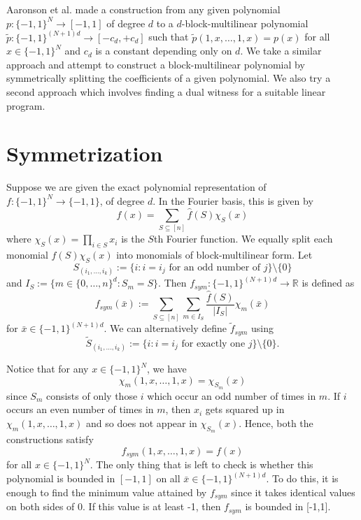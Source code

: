 \documentclass[12pt]{report}
\begin{document}
Aaronson et al. \cite{paper2} made a construction from any given polynomial $p\colon \{-1,1\}^{N} \rightarrow [-1,1]$ of degree $d$ to a $d$-block-multilinear polynomial $\tilde{p}\colon \{-1,1\}^{(N+1) d} \rightarrow [-c_d, +c_d]$ such that $\tilde{p}(1,x, \ldots, 1,x) = p(x)$ for all $x \in\{-1,1\}^{N}$ and $c_d$ is a constant depending only on $d$. We take a similar approach and attempt to construct a block-multilinear polynomial by symmetrically splitting the coefficients of a given polynomial. We also try a second approach which involves finding a dual witness for a suitable linear program.

\section{Symmetrization}
Suppose we are given the exact polynomial representation of $f\colon \{-1,1\}^N\rightarrow \{-1,1\}$, of degree $d$. In the Fourier basis, this is given by
\begin{equation}
    f(x) = \sum_{S\subseteq [n]} \hat{f}(S) \chi_S(x)
\end{equation}
where $\chi_S(x) = \prod_{i\in S}x_i$ is the $S$th Fourier function. We equally split each monomial $\hat{f}(S) \chi_S(x)$ into monomials of block-multilinear form. Let
\begin{equation}
S_{(i_1, \dots, i_k)} := \{i\colon i = i_j\text{ for an odd number of }j\} \setminus \{0\}
\end{equation} and $I_S := \{m\in \{0, \ldots, n\}^d\colon S_m = S\}$. Then $f_{sym}\colon \{-1,1\}^{(N+1)d} \rightarrow \mathbb{R}$ is defined as
\begin{equation}
    f_{sym}(\bar{x}) := \sum_{S\subseteq [n]} \sum_{m\in I_S} \frac{\hat{f}(S)}{|I_S|} \chi_m(\bar{x})
\end{equation}
for $\bar{x}\in \{-1,1\}^{(N+1)d}$. We can alternatively define $\tilde{f}_{sym}$ using
\begin{equation}
    \tilde{S}_{(i_1, \dots, i_k)} := \{i\colon i = i_j\text{ for exactly one }j\} \setminus \{0\}.
\end{equation}

Notice that for any $x \in \{-1,1\}^{N}$, we have
\begin{equation}
    \chi_m(1,x, \ldots, 1,x) = \chi_{S_m}(x)
\end{equation}
since $S_m$ consists of only those $i$ which occur an odd number of times in $m$. If $i$ occurs an even number of times in $m$, then $x_i$ gets squared up in $\chi_m(1,x, \ldots, 1,x)$ and so does not appear in $\chi_{S_m}(x)$. Hence, both the constructions satisfy
\begin{equation}
    f_{sym}(1,x, \ldots, 1,x) = f(x)
\end{equation}
for all $x \in \{-1,1\}^N$. The only thing that is left to check is whether this polynomial is bounded in $[-1,1]$ on all $\bar{x} \in \{-1,1\}^{(N+1)d}$. To do this, it is enough to find the minimum value attained by $f_{sym}$ since it takes identical values on both sides of 0. If this value is at least -1, then $f_{sym}$ is bounded in [-1,1].
\end{document}
